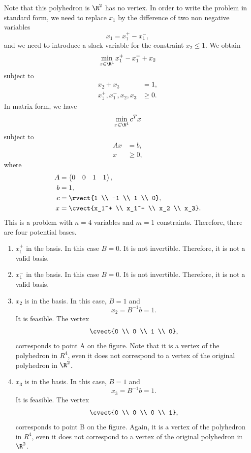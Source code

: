 Note that this polyhedron is $\R^2$ has no vertex. In order to write
the problem in standard form, we need to replace $x_1$ by the
difference of two non negative variables
\[
x_1 = x_1^+ - x_1^-,
\]
and we need to introduce a slack variable for the constraint $x_2 \leq 1$.
We obtain
\[
\min_{x \in \R^4} x_1^+ - x_1^-  + x_2
\]
subject to
\begin{align*}
  x_2 + x_3 &= 1, \\
  x_1^+, x_1^-, x_2, x_3 &\geq 0.
\end{align*}
In matrix form, we have
\[
\min_{x \in \R^4} c^T x
\]
subject to
\begin{align*}
  Ax &= b, \\
  x &\geq 0,
\end{align*}
where
\begin{align*}
  A &= \begin{pmatrix}
    0 & 0 & 1 & 1 
  \end{pmatrix}, \\
  b &= 1, \\
  c &= \rvect{1 \\ -1 \\ 1 \\ 0},\\
  x &= \cvect{x_1^+ \\ x_1^- \\ x_2 \\ x_3}.
\end{align*}
This is a problem with $n=4$ variables and $m=1$
constraints. Therefore, there are four potential bases.
\begin{enumerate}
\item $x_1^+$ in the basis. In this case $B=0$. It is not
  invertible. Therefore, it is not a valid basis. 
\item $x_1^-$ in the basis. In this case $B=0$. It is not
  invertible. Therefore, it is not a valid basis.
\item $x_2$ is in the basis. In this case, $B=1$ and
  \[
  x_2=B^{-1}b=1.
  \]
  It is feasible. The vertex
  \[
\cvect{0 \\ 0 \\ 1 \\ 0},
\]
corresponds to point A on the figure. Note that it is a vertex of
the polyhedron in $R^4$, even it does not correspond to a vertex of
the original polyhedron in $\R^2$.
\item $x_3$ is in the basis. In this case, $B=1$ and
  \[
  x_3=B^{-1}b=1.
  \]
  It is feasible. The vertex
  \[
\cvect{0 \\ 0 \\ 0 \\ 1},
\]
corresponds to point B on the figure. Again, it is a vertex of
the polyhedron in $R^4$, even it does not correspond to a vertex of
the original polyhedron in $\R^2$.
\end{enumerate}



